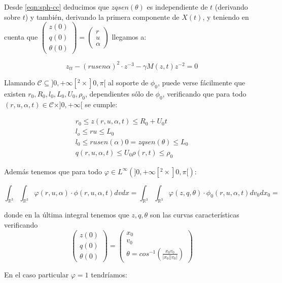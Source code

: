 \documentclass[a4paper,10pt]{scrartcl}
\theoremstyle{definition}
\numberwithin{equation}{section}
\begin{document}
Desde \eqref{eqn:sph-cc} deducimos que $zqsen(\theta)$ es independiente de $t$ (derivando sobre $t$) y también, derivando la primera componente de $X(t)$, y teniendo en cuenta que $\left(\begin{array}{c} z(0)\\ q(0)\\ \theta(0) \end{array}\right) = 
\left(\begin{array}{c} r\\ u\\ \alpha\end{array}\right)$ llegamos a:

\[
 z_{tt} - (ru sen\alpha)^2 \cdot z^{-3} - \gamma M(z,t) z^{-2} = 0
\]

Llamando $\mathcal{C} \subseteq ]0, +\infty[^2 \times ]0, \pi[$ al soporte de $\phi_0$, puede verse fácilmente que existen $r_0, R_0, l_0, L_0, U_0, \rho_0$, dependientes sólo de $\phi_0$, verificando que para todo $(r,u,\alpha,t) \in \mathcal{C} \times ]0, +\infty[$ se cumple:

\begin{align*}
 r_0 \le z(r,u,\alpha,t) \le R_0 + U_0 t\\
 l_o \le ru \le L_0\\
 l_0 \le ru sen(\alpha) 0 = zq sen(\theta) \le L_0\\
 q(r,u,\alpha, t) \le U_0
 \rho(r,t) \le \rho_0
\end{align*}

Además tenemos que para todo $\varphi \in L^{\infty}(]0,+\infty[^2 \times ]0,\pi[)$:

\[
    \int_{\mathbb{R}^3}\int_{\mathbb{R}^3} \varphi(r,u,\alpha) \cdot \phi(r,u,\alpha,t) dv dx = 
    \int_{\mathbb{R}^3}\int_{\mathbb{R}^3} \varphi(z,q,\theta) \cdot \phi_0(r,u,\alpha,t) dv_0 dx_0 = 
\]

donde en la última integral tenemos que $z,q,\theta$ son las curvas características verificando 
\[
    \left(\begin{array}{c} z(0)\\ q(0)\\ \theta(0) \end{array}\right) = 
    \left(\begin{array}{c} x_0\\ v_0\\ \theta=cos^{-1}\left(\frac{x_0 v_0}{|x_0||v_0|}\right) \end{array}\right)
\]

En el caso particular $\varphi = 1$ tendríamos:
\end{document}
